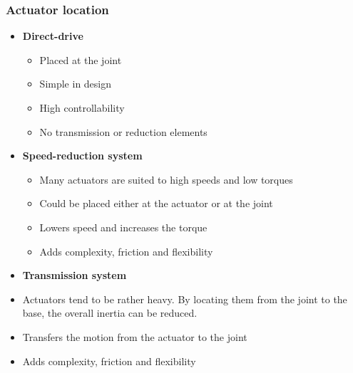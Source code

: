 \documentclass[10pt,a4paper]{article}
\begin{document}
\subsubsection{Actuator location}
\begin{itemize}
	\item \textbf{Direct-drive}
	\begin{itemize}
		\item Placed at the joint
		\item Simple in design
		\item High controllability
		\item No transmission or reduction elements
	\end{itemize}
	\item \textbf{Speed-reduction system}
	\begin{itemize}
		\item Many actuators are suited to high speeds and low torques
		\item Could be placed either at the actuator or at the joint
		\item Lowers speed and increases the torque
		\item Adds complexity, friction and flexibility
	\end{itemize}
	\item \textbf{Transmission system}
		\item Actuators tend to be rather heavy. By locating them from the joint to the base, the overall inertia can be reduced.
		\item Transfers the motion from the actuator to the joint
		\item Adds complexity, friction and flexibility
\end{itemize}
\end{document}
